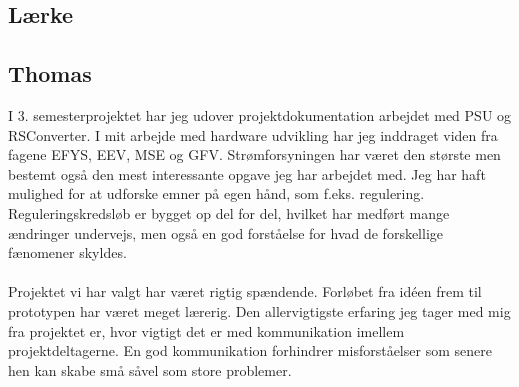 \subsection{Lærke}

\subsection{Thomas}
I 3. semesterprojektet har jeg udover projektdokumentation arbejdet med PSU og RSConverter. I mit arbejde med hardware udvikling har jeg inddraget viden fra fagene EFYS, EEV, MSE og GFV. Strømforsyningen har været den største men bestemt også den mest interessante opgave jeg har arbejdet med. Jeg har haft mulighed for at udforske emner på egen hånd, som f.eks. regulering. Reguleringskredsløb er bygget op del for del, hvilket har medført mange ændringer undervejs, men også en god forståelse for hvad de forskellige fænomener skyldes.
\\\\
Projektet vi har valgt har været rigtig spændende. Forløbet fra idéen frem til prototypen har været meget lærerig. Den allervigtigste erfaring jeg tager med mig fra projektet er, hvor vigtigt det er med kommunikation imellem projektdeltagerne. En god kommunikation forhindrer misforståelser som senere hen kan skabe små såvel som store problemer.